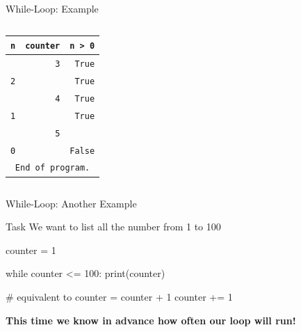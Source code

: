 \begin{frame}{While-Loop: Example}
\begin{columns}[totalwidth=\textwidth, t]
\begin{column}{0.5\textwidth}
\begin{center}
        \begin{tabular}{r r r}
            \textbf{\texttt{n}} & \textbf{\texttt{counter}} & \textbf{\texttt{n > 0}} \\
            \hline \hline
            \texttt{\color{red}{2}} & \texttt{3} & \texttt{True} \\
            \texttt{2} & \texttt{\color{red}{4}} & \texttt{True} \\
            \hline
            \texttt{\color{red}{1}} & \texttt{4} & \texttt{True} \\
            \texttt{1} & \texttt{\color{red}{5}} & \texttt{True} \\
            \hline
            \texttt{\color{red}{0}} & \texttt{5} & \texttt{\color{red}{False}} \\
            \texttt{0} & \texttt{\color{red}{6}} & \texttt{False} \\
            \hline \hline
            \multicolumn{3}{c}{\texttt{End of program.}}
        \end{tabular}

        \end{center}

    \end{column}

    \end{columns}

\end{frame}

\begin{frame}[fragile]{While-Loop: Another Example}

    \begin{block}{Task}
        We want to list all the number from 1 to 100
    \end{block}

    \pause

    \begin{pythoncode}
    counter = 1

    while counter <= 100:
        print(counter)

        # equivalent to counter = counter + 1
        counter += 1
    \end{pythoncode}

    \pause
    \vspace{1em}

    \textbf{This time we know in advance how often our loop will run!}


\end{frame}


